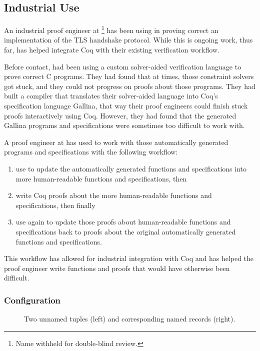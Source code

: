 \subsection{Industrial Use}
\label{sec:industry}

An industrial proof engineer at \company\footnote{Name withheld for double-blind review.} has been using \toolname in proving
correct an implementation of the TLS handshake protocol.
While this is ongoing work, thus far,
\toolname has helped \company integrate Coq with their existing verification workflow.

Before contact, \company had been using a custom solver-aided verification language to prove correct C programs.
They had found that at times, those constraint solvers got stuck, and they could not
progress on proofs about those programs.
They had built a compiler that translates their solver-aided language into Coq's specification language Gallina,
that way their proof engineers could finish stuck proofs interactively using Coq.
However, they had found that the generated Gallina programs and specifications were sometimes too difficult to work with.

A proof engineer at \company has used \toolname to work with those automatically generated programs and specifications
with the following workflow:

\begin{enumerate}
\item use \toolname to update the automatically generated functions and specifications into more
human-readable functions and specifications, then
\item write Coq proofs about the more human-readable functions and specifications, then finally
\item use \toolname again to update those proofs about human-readable functions and specifications back to
proofs about the original automatically generated functions and specifications.
\end{enumerate}
This workflow has allowed for industrial integration with Coq and has helped the proof engineer write functions and proofs
that would have otherwise been difficult.


\subsubsection{Configuration}

\begin{figure}
\begin{minipage}{0.25\textwidth}
   
\end{minipage}
\hfill
\begin{minipage}{0.74\textwidth}
   
\end{minipage}
\vspace{-0.3cm}
\caption{Two unnamed tuples (left) and corresponding named records (right).}
\label{fig:records}
\end{figure}

